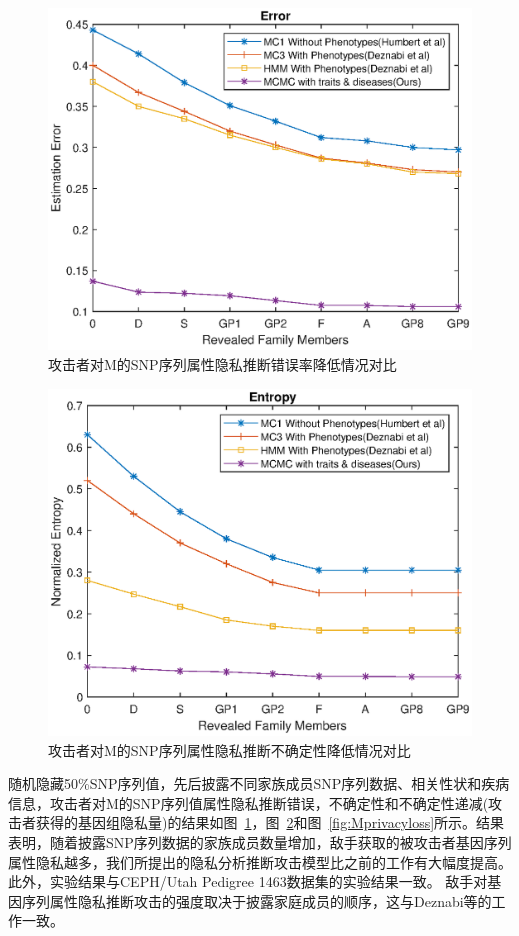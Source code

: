 \begin{figure}[htbp]
	\centering
	\includegraphics[width=0.8\linewidth]{./figures/Merror1.eps}
	\centering
	\caption{攻击者对M的SNP序列属性隐私推断错误率降低情况对比}\label{fig:Merror1}
\end{figure}



\begin{figure}[htbp]
	\centering
	\includegraphics[width=0.8\linewidth]{./figures/Mentropy1.eps}
	\centering
	\caption{攻击者对M的SNP序列属性隐私推断不确定性降低情况对比}\label{fig:Mentropy}
\end{figure}


随机隐藏50\%SNP序列值，先后披露不同家族成员SNP序列数据、相关性状和疾病信息，攻击者对M的SNP序列值属性隐私推断错误，不确定性和不确定性递减(攻击者获得的基因组隐私量)的结果如图~\ref{fig:Merror1}，图~\ref{fig:Mentropy}和图~\ref{fig:Mprivacyloss}所示。结果表明，随着披露SNP序列数据的家族成员数量增加，敌手获取的被攻击者基因序列属性隐私越多，我们所提出的隐私分析推断攻击模型比之前的工作有大幅度提高。此外，实验结果与CEPH/Utah Pedigree 1463数据集的实验结果一致。 敌手对基因序列属性隐私推断攻击的强度取决于披露家庭成员的顺序，这与Deznabi等的工作一致。

